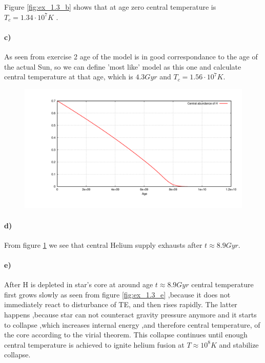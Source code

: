\documentclass[12pt]{article}
\begin{document}
Figure \ref{fig:ex_1.3_b} shows that at age zero central temperature is $T_c=1.34 \cdot 10^7 K$ .

\paragraph{c)}
As seen from exercise 2 age of the model is in good correspondance to the age of the actual Sun, so we can define 'most like' model as this one and calculate central temperature at that age, which is $4.3 Gyr$  and $T_c=1.56 \cdot 10^7 K$. 

\begin{figure}[!ht]
\begin{center}
\includegraphics[width=1.0\textwidth]{ex_1_3_d.png}
\end{center}
\vspace*{-10mm}
\caption{}
\label{fig:ex_1.3_d}
\end{figure}

\paragraph{d)}
From figure \ref{fig:ex_1.3_d} we see that central Helium supply exhausts after $t\approx 8.9 Gyr$. 

\paragraph{e)}

After H is depleted in star's core at around age $t\approx 8.9 Gyr$ central temperature first grows slowly  as seen from figure \ref{fig:ex_1.3_e} ,because it does not immediately react to disturbance of TE, and then rises rapidly. The latter happens ,because star can not counteract gravity pressure anymore and it starts to collapse ,which increases internal energy ,and therefore central temperature, of the core according to the virial theorem. This collapse continues until enough central temperature is achieved to ignite helium fusion at $T\approx 10^8 K$ and stabilize collapse.
\end{document}
